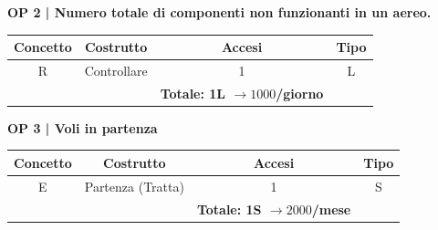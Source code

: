 \vspace{.6cm}


\textbf{\small OP 2 | Numero totale di componenti non funzionanti in un aereo.}\\

\begin{tabular}{ c c c c} %
	\hline
	\textbf{Concetto} & \textbf{Costrutto} & \textbf{Accesi} & \textbf{Tipo}\\
	\hline
	\textsf{\small R} & \textsf{\small Controllare} & \textsf{\small 1} &  \textsf{\small L}\\
	\hline
	\textsf{\small } & \textsf{\small } & \textbf{Totale: 1L $\rightarrow 1000$/giorno} \textsf{\small } & \textsf{\small }\\ %
	\hline
\end{tabular}

\vspace{.6cm}


\textbf{\small OP 3 | Voli in partenza}\\

\begin{tabular}{ c c c c} %
	\hline
	\textbf{Concetto} & \textbf{Costrutto} & \textbf{Accesi} & \textbf{Tipo}\\
	\hline
	\textsf{\small E} & \textsf{\small Partenza (Tratta)} & \textsf{\small 1} &  \textsf{\small S}\\
	\hline
	\textsf{\small } & \textsf{\small } & \textbf{Totale: 1S $\rightarrow 2000$/mese} \textsf{\small } & \textsf{\small }\\
	\hline
\end{tabular}

\vspace{.6cm}

